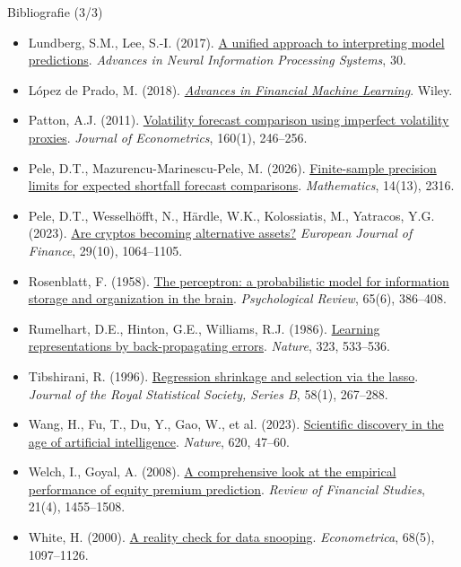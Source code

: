\begin{frame}{Bibliografie (3/3)}
\itemsize{\tiny}
\begin{itemize}
    \item Lundberg, S.M., Lee, S.-I. (2017). \href{https://proceedings.neurips.cc/paper/2017/hash/8a20a8621978632d76c43dfd28b67767-Abstract.html}{A unified approach to interpreting model predictions}. \textit{Advances in Neural Information Processing Systems}, 30.
    \item López de Prado, M. (2018). \href{https://www.wiley.com/en-us/Advances+in+Financial+Machine+Learning-p-9781119482086}{\textit{Advances in Financial Machine Learning}}. Wiley.
    \item Patton, A.J. (2011). \href{https://doi.org/10.1016/j.jeconom.2010.03.034}{Volatility forecast comparison using imperfect volatility proxies}. \textit{Journal of Econometrics}, 160(1), 246--256.
    \item Pele, D.T., Mazurencu-Marinescu-Pele, M. (2026). \href{https://doi.org/10.3390/math14132316}{Finite-sample precision limits for expected shortfall forecast comparisons}. \textit{Mathematics}, 14(13), 2316.
    \item Pele, D.T., Wesselhöfft, N., Härdle, W.K., Kolossiatis, M., Yatracos, Y.G. (2023). \href{https://doi.org/10.1080/1351847X.2021.1960403}{Are cryptos becoming alternative assets?} \textit{European Journal of Finance}, 29(10), 1064--1105.
    \item Rosenblatt, F. (1958). \href{https://doi.org/10.1037/h0042519}{The perceptron: a probabilistic model for information storage and organization in the brain}. \textit{Psychological Review}, 65(6), 386--408.
    \item Rumelhart, D.E., Hinton, G.E., Williams, R.J. (1986). \href{https://doi.org/10.1038/323533a0}{Learning representations by back-propagating errors}. \textit{Nature}, 323, 533--536.
    \item Tibshirani, R. (1996). \href{https://doi.org/10.1111/j.2517-6161.1996.tb02080.x}{Regression shrinkage and selection via the lasso}. \textit{Journal of the Royal Statistical Society, Series B}, 58(1), 267--288.
    \item Wang, H., Fu, T., Du, Y., Gao, W., et al. (2023). \href{https://doi.org/10.1038/s41586-023-06221-2}{Scientific discovery in the age of artificial intelligence}. \textit{Nature}, 620, 47--60.
    \item Welch, I., Goyal, A. (2008). \href{https://doi.org/10.1093/rfs/hhm014}{A comprehensive look at the empirical performance of equity premium prediction}. \textit{Review of Financial Studies}, 21(4), 1455--1508.
    \item White, H. (2000). \href{https://doi.org/10.1111/1468-0262.00152}{A reality check for data snooping}. \textit{Econometrica}, 68(5), 1097--1126.
\end{itemize}
\end{frame}


